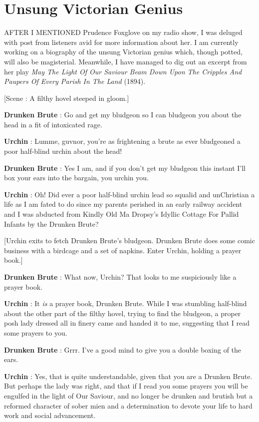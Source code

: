 \chapter{Unsung Victorian Genius}
\begingroup
\setlength{\parindent}{0in}
\setlength{\parskip}{\baselineskip}
AFTER I MENTIONED Prudence Foxglove on my radio show, I was deluged with post from listeners avid for more information about her. I am currently working on a biography of the unsung Victorian genius which, though potted, will also be magisterial. Meanwhile, I have managed to dig out an excerpt from her play \emph{May The Light Of Our Saviour Beam Down Upon The Cripples And Paupers Of Every Parish In The Land} (1894).

[Scene : A filthy hovel steeped in gloom.]

\textbf{Drunken Brute} : Go and get my bludgeon so I can bludgeon you about the head in a fit of intoxicated rage.

\textbf{Urchin} : Lumme, guvnor, you're as frightening a brute as ever bludgeoned a poor half-blind urchin about the head!

\textbf{Drunken Brute} : Yes I am, and if you don't get my bludgeon this instant I'll box your ears into the bargain, you urchin you.

\textbf{Urchin} : Oh! Did ever a poor half-blind urchin lead so squalid and unChristian a life as I am fated to do since my parents perished in an early railway accident and I was abducted from Kindly Old Ma Dropsy's Idyllic Cottage For Pallid Infants by the Drunken Brute?

[Urchin exits to fetch Drunken Brute's bludgeon. Drunken Brute does some comic business with a birdcage and a set of napkins. Enter Urchin, holding a prayer book.]

\textbf{Drunken Brute} : What now, Urchin? That looks to me suspiciously like a prayer book.

\textbf{Urchin} : It \emph{is} a prayer book, Drunken Brute. While I was stumbling half-blind about the other part of the filthy hovel, trying to find the bludgeon, a proper posh lady dressed all in finery came and handed it to me, suggesting that I read some prayers to you.

\textbf{Drunken Brute} : Grrr. I've a good mind to give you a double boxing of the ears.

\textbf{Urchin} : Yes, that is quite understandable, given that you are a Drunken Brute. But perhaps the lady was right, and that if I read you some prayers you will be engulfed in the light of Our Saviour, and no longer be drunken and brutish but a reformed character of sober mien and a determination to devote your life to hard work and social advancement.

